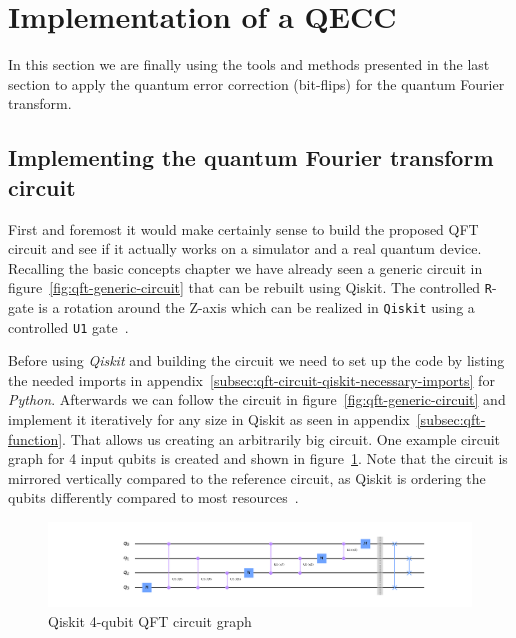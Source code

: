 \section{Implementation of a QECC}
\label{sec:implementation}

In this section we are finally using the tools and methods presented in the last section to apply the quantum error correction (bit-flips) for the quantum Fourier transform.

\subsection{Implementing the quantum Fourier transform circuit}
\label{subsec:implementing-quantum-fourier-transform-circuit}

First and foremost it would make certainly sense to build the proposed QFT circuit and see if it actually works on a simulator and a real quantum device.
Recalling the basic concepts chapter we have already seen a generic circuit in figure~\ref{fig:qft-generic-circuit} that can be rebuilt using Qiskit.
The controlled \texttt{R}-gate is a rotation around the Z-axis which can be realized in \texttt{Qiskit} using a controlled \texttt{U1} gate~\cite{ControlledU1Gate}.

Before using \emph{Qiskit} and building the circuit we need to set up the code by listing the needed imports in appendix~\ref{subsec:qft-circuit-qiskit-necessary-imports} for \emph{Python}.
Afterwards we can follow the circuit in figure~\ref{fig:qft-generic-circuit} and implement it iteratively for any size in Qiskit as seen in appendix~\ref{subsec:qft-function}.
That allows us creating an arbitrarily big circuit.
One example circuit graph for 4 input qubits is created and shown in figure~\ref{fig:qft-4-qubit-circuit}.
Note that the circuit is mirrored vertically compared to the reference circuit, as Qiskit is ordering the qubits differently compared to most resources~\cite{QiskitGettingStarted}.

\begin{figure}[H]
    \centering
    \includegraphics[width=\textwidth]{res/qft-4-qubits-circuit.pdf}
    \caption{Qiskit 4-qubit QFT circuit graph}
    \label{fig:qft-4-qubit-circuit}
\end{figure}

